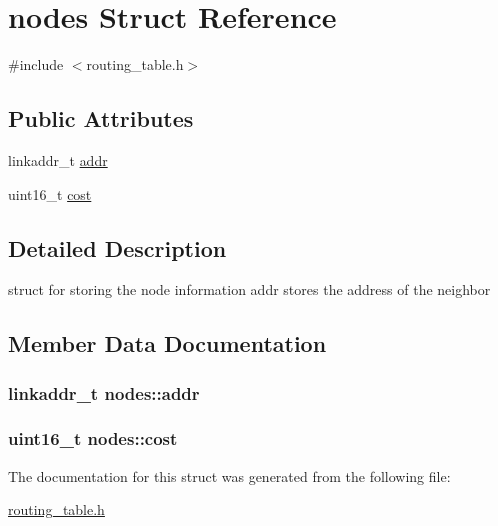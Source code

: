 \hypertarget{structnodes}{}\section{nodes Struct Reference}
\label{structnodes}


{\ttfamily \#include $<$routing\+\_\+table.\+h$>$}

\subsection*{Public Attributes}
\begin{DoxyCompactItemize}
\item 
linkaddr\+\_\+t \hyperlink{structnodes_a954ec89d56174fde639a77adc5fbabe2}{addr}
\item 
uint16\+\_\+t \hyperlink{structnodes_a46fbfcd12a135e35330570f8e67fd210}{cost}
\end{DoxyCompactItemize}


\subsection{Detailed Description}
struct for storing the node information addr stores the address of the neighbor 

\subsection{Member Data Documentation}
\subsubsection[{\texorpdfstring{addr}{addr}}]{\setlength{\rightskip}{0pt plus 5cm}linkaddr\+\_\+t nodes\+::addr}\hypertarget{structnodes_a954ec89d56174fde639a77adc5fbabe2}{}\label{structnodes_a954ec89d56174fde639a77adc5fbabe2}
\subsubsection[{\texorpdfstring{cost}{cost}}]{\setlength{\rightskip}{0pt plus 5cm}uint16\+\_\+t nodes\+::cost}\hypertarget{structnodes_a46fbfcd12a135e35330570f8e67fd210}{}\label{structnodes_a46fbfcd12a135e35330570f8e67fd210}


The documentation for this struct was generated from the following file\+:\begin{DoxyCompactItemize}
\item 
\hyperlink{routing__table_8h}{routing\+\_\+table.\+h}\end{DoxyCompactItemize}
